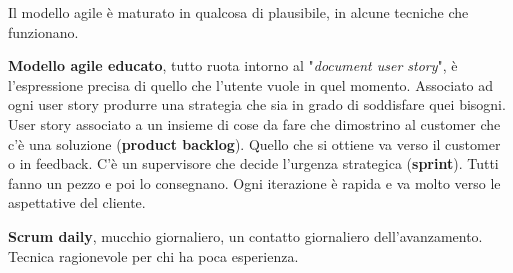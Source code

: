 Il modello agile è maturato in qualcosa di plausibile, in alcune tecniche che funzionano.

\textbf{Modello agile educato}, tutto ruota intorno al "\textit{document user story}", è l'espressione precisa di quello che l'utente vuole in quel momento. Associato ad ogni user story produrre una strategia che sia in grado di soddisfare quei bisogni. User story associato a un insieme di cose da fare che dimostrino al customer che c'è una soluzione (\textbf{product backlog}). Quello che si ottiene va verso il customer o in feedback. C'è un supervisore che decide l'urgenza strategica (\textbf{sprint}). Tutti fanno un pezzo e poi lo consegnano. Ogni iterazione è rapida e va molto verso le aspettative del cliente.

\textbf{Scrum daily}, mucchio giornaliero, un contatto giornaliero dell'avanzamento. Tecnica ragionevole per chi ha poca esperienza.

